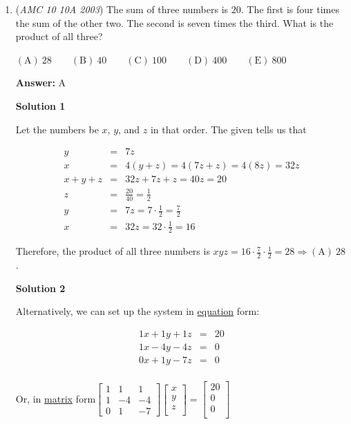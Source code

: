 \begin{enumerate}
 Therefore, the probability that $x<y$ is $\frac{\frac{12}{12}}{54}=\frac{3}{8} \Rightarrow \boxed{\mathrm{(C)}\ \frac{3}{8}}$



	\item (\textit{AMC 10 10A 2003}) The sum of three numbers is $20$. The first is four times the sum of the other two. The second is seven times the third. What is the product of all three? 


 $\mathrm{(A) \ } 28\qquad \mathrm{(B) \ } 40\qquad \mathrm{(C) \ } 100\qquad \mathrm{(D) \ } 400\qquad \mathrm{(E) \ } 800$

 \textbf{Answer: }A



\textbf{Solution 1}

Let the numbers be $x$, $y$, and $z$ in that order. The given tells us that 

 
 \begin{eqnarray*}y&=&7z\\ x&=&4(y+z)=4(7z+z)=4(8z)=32z\\ x+y+z&=&32z+7z+z=40z=20\\ z&=&\frac{20}{40}=\frac{1}{2}\\ y&=&7z=7\cdot\frac{1}{2}=\frac{7}{2}\\ x&=&32z=32\cdot\frac{1}{2}=16 \end{eqnarray*}

 Therefore, the product of all three numbers is $xyz=16\cdot\frac{7}{2}\cdot\frac{1}{2}=28 \Rightarrow \boxed{\mathrm{(A)}\ 28}$.

 



\textbf{Solution 2}

Alternatively, we can set up the system in \href{https://artofproblemsolving.com/wiki/index.php?title=Equation}{equation} form:

 
 \begin{eqnarray*}1x+1y+1z&=&20\\ 1x-4y-4z&=&0\\ 0x+1y-7z&=&0\\ \end{eqnarray*}

 Or, in \href{https://artofproblemsolving.com/wiki/index.php?title=Matrix}{matrix} form$\begin{bmatrix} 1 & 1 & 1 \\ 1 & -4 & -4 \\ 0 & 1 & -7 \end{bmatrix} \begin{bmatrix} x \\ y \\ z \\ \end{bmatrix} =\begin{bmatrix} 20 \\ 0 \\ 0 \\ \end{bmatrix}$


\end{enumerate}
